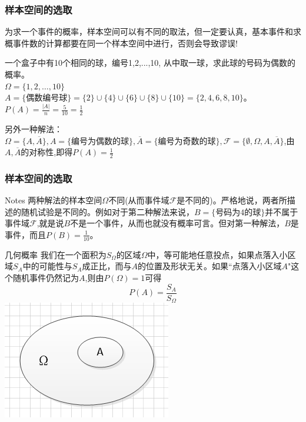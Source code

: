\begin{frame}
\frametitle{样本空间的选取}
为求一个事件的概率，样本空间可以有不同的取法，但一定要认真，基本事件和求概事件数的计算都要在同一个样本空间中进行，否则会导致谬误!
\begin{example}
	一个盒子中有10个相同的球，编号1,2,...,10, 从中取一球，求此球的号码为偶数的概率。\\
	$\Omega=\{1,2,\dots,10\}$\\
	$A=\{\text{偶数编号球} \}=\{2\}\cup\{4\}\cup\{6\}\cup\{8\}\cup\{10\}=\{2,4,6,8,10\}$。\\
	$P(A)=\frac{|A|}{n}=\frac{5}{10}=\frac{1}{2}$
\end{example}
另外一种解法：$\Omega=\{A,\overline{A}\},A=\{\text{编号为偶数的球}\},\overline{A}=\{\text{编号为奇数的球}\},\mathcal{F}=\{\emptyset,\Omega,A,\overline{A}\}$,由$A,\overline{A}$的对称性,即得$P(A)=\frac{1}{2}$

\end{frame}

\begin{frame}
\frametitle{样本空间的选取}
\begin{block}{Notes}
	两种解法的样本空间$\Omega$不同(从而事件域$\mathcal{F}$是不同的)。严格地说，两者所描述的随机试验是不同的。例如对于第二种解法来说，$B=\{\text{号码为4的球}\}$并不属于事件域$\mathcal{F}$,就是说$B$不是一个事件，从而也就没有概率可言。但对第一种解法，$B$是事件，而且$P(B)=\frac{1}{10}$。
\end{block}
\end{frame}

\begin{frame}{几何概率}
我们在一个面积为$S_\Omega$的区域$\Omega$中，等可能地任意投点，如果点落入小区域$S_A$中的可能性与$S_A$成正比，而与$A$的位置及形状无关。如果``点落入小区域$A$"这个随机事件仍然记为$A$,则由$P(\Omega)=1$可得
$$P(A)=\frac{S_A}{S_\Omega}$$
\includegraphics[scale=0.4]{geometry}
\end{frame}

